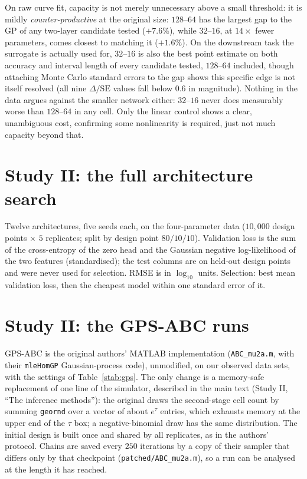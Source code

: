 \documentclass[11pt]{article}
\begin{document}
On raw curve fit, capacity is not merely unnecessary above a small
threshold: it is mildly \emph{counter-productive} at the original size:
$128$--$64$ has the largest gap to the GP of any two-layer candidate tested
($+7.6\%$), while $32$--$16$, at $14\times$ fewer parameters, comes closest to
matching it ($+1.6\%$). On the downstream task the surrogate is actually
used for, $32$--$16$ is also the best point estimate on both accuracy and
interval length of every candidate tested, $128$--$64$ included, though
attaching Monte Carlo standard errors to the gap shows this specific edge is
not itself resolved (all nine $\Delta/\mathrm{SE}$ values fall below $0.6$ in
magnitude). Nothing in the data argues against the smaller network either:
$32$--$16$ never does measurably worse than $128$--$64$ in any cell. Only the
linear control shows a clear, unambiguous cost, confirming some nonlinearity
is required, just not much capacity beyond that.

\section{Study II: the full architecture search}
\label{ssec:s2-arch}

Twelve architectures, five seeds each, on the four-parameter data ($10{,}000$ design points $\times$ $5$ replicates; split by design
point $80/10/10$). Validation loss is the sum of the cross-entropy of the zero head and the Gaussian negative log-likelihood of
the two features (standardised); the test columns are on held-out design points and were never used for selection. RMSE is in
$\log_{10}$ units. Selection: best mean validation loss, then the cheapest model within one standard error of it.

\begin{table}[h]
\centering
\caption{Study II: full architecture search (mean over five seeds; $\pm$ s.d.\ for the validation loss).}
\label{stab:arch4D}
\scriptsize

\end{table}

\section{Study II: the GPS-ABC runs}
\label{ssec:s3-gps}

GPS-ABC is the original authors' MATLAB implementation (\texttt{ABC\_mu2a.m}, with their \texttt{mleHomGP} Gaussian-process code),
unmodified, on our observed data sets, with the settings of Table~\ref{stab:gps}. The only change is a memory-safe replacement of
one line of the simulator, described in the main text (Study II, ``The inference methods''): the original draws the second-stage
cell count by summing \texttt{geornd} over a vector of about $e^{\tau}$ entries, which exhausts memory at the upper end of the
$\tau$ box; a negative-binomial draw has the same distribution. The initial design is built once and shared by all replicates,
as in the authors' protocol. Chains are saved every $250$ iterations by a copy of their sampler that differs only by that checkpoint (\texttt{patched/ABC\_mu2a.m}), so a run can be analysed at the length it has reached.
\end{document}
